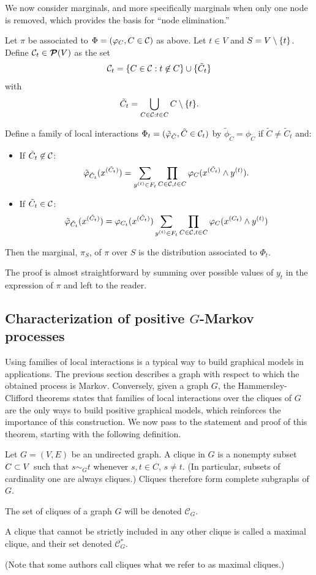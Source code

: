 We now consider marginals, and more specifically marginals when only
one node is removed, which provides the basis for ``node elimination.'' 
\begin{proposition}
\label{prop:gc.m}
Let $\pi$ be associated to $\Phi = (\varphi_C, C\in {\mathcal C})$ as above. Let
$t\in V$ and $S = V\setminus \{t\}$. Define ${\mathcal C}_t\in {\bm{\mathcal P}({V})}$ as the set
\[
{\mathcal C}_t = \{C\in {\mathcal C}: t\not \in C\} \cup \{\tilde C_t\}
\]
with 
\[
\tilde C_t = \bigcup_{C\in {\mathcal C}: t\in C}C \setminus \{t\}.
\]

Define a family of local interactions $\Phi_t = (\tilde {\varphi}_{\tilde C},
\tilde C\in
{\mathcal C}_t)$ by $\tilde \phi_{\tilde C} = \phi_{\tilde C}$ if $\tilde C\neq
\tilde C_t$ and: 
\begin{itemize}
\item If $\tilde C_t \not\in {\mathcal C}$:
\[
\tilde {\varphi}_{\tilde C_t}(x^{(\tilde C_t)}) = \sum_{y^{(t)}\in F_t} \prod_{C\in {\mathcal C}, t\in C}
\varphi_C(x^{(\tilde C_t)}\wedge y^{(t)}).
\]
\item If $\tilde C_t \in {\mathcal C}$:
\[
\tilde {\varphi}_{\tilde C_t}(x^{(\tilde C_t)}) = \varphi_{C_t}(x^{(\tilde C_t)}) \sum_{y^{(t)}\in F_t} \prod_{C\in {\mathcal C}, t\in C}
\varphi_C(x^{(C_t)}\wedge y^{(t)})
\]
\end{itemize}
Then the marginal, $\pi_S$, of $\pi$ over $S$ is the distribution
associated to $\Phi_t$.
\end{proposition}
The proof is almost straightforward by summing over possible values of
$y_t$ in the expression of $\pi$ and left to the reader. 

\subsection{Characterization of positive $G$-Markov processes}
 
Using families of local interactions is a typical way to build
graphical models in applications. The previous section describes a
graph with respect to which the obtained process is
Markov. Conversely, given a graph $G$, the Hammersley-Clifford theorems
states that families of local interactions over the cliques of $G$
are the only ways to build positive graphical models, which reinforces
the importance of this construction. We now pass to the statement and
proof of this theorem, starting with the following definition.

\begin{definition}
\label{def:cli}
Let $G = (V, E)$ be an undirected graph. A clique in $G$ is a nonempty
subset
$C\subset V$ such that $s\sim_G t$ whenever $s,t\in C$, $s\neq t$.
(In particular, subsets of cardinality one are always cliques.)
Cliques therefore form complete subgraphs of $G$.

The set of cliques of a graph $G$ will be denoted $\mathcal C_G$.

A clique that cannot be strictly included in any other clique is
called a maximal clique, and their set denoted $\mathcal C^*_G$. 

(Note that some authors call cliques what we refer to
as maximal cliques.)

\end{definition}

